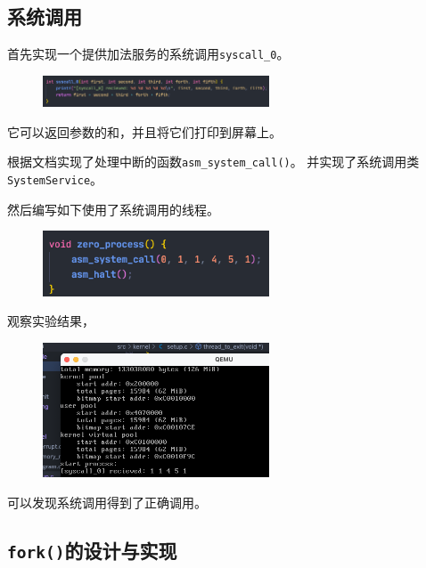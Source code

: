 \subsection{系统调用}

首先实现一个提供加法服务的系统调用\texttt{syscall\_0}。

\begin{figure}[H]
    \centering
    \includegraphics[width=0.6\textwidth]{figures/zeroSyscall.png}
    \label{zeroSyscall}
\end{figure}

它可以返回参数的和，并且将它们打印到屏幕上。

根据文档实现了处理中断的函数\texttt{asm\_system\_call()}。
并实现了系统调用类\texttt{SystemService}。

然后编写如下使用了系统调用的线程。

\begin{figure}[H]
    \centering
    \includegraphics[width=0.6\textwidth]{figures/zero.png}
    \label{zero}
\end{figure}

观察实验结果，

\begin{figure}[H]
    \centering
    \includegraphics[width=0.6\textwidth]{figures/zeroRes.png}
    \label{zeroRes}
\end{figure}

可以发现系统调用得到了正确调用。

\subsection{\texttt{fork()}的设计与实现}

